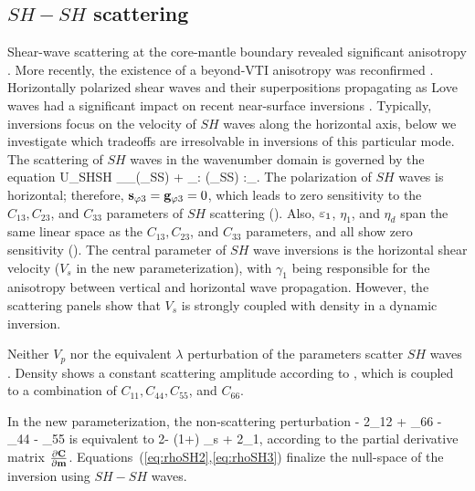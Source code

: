 \subsection{$SH-SH$ scattering}
%
Shear-wave scattering at the core-mantle boundary revealed significant anisotropy  \citep{fukao1984,silver1991,babuska1991,vinnik1992}. More recently, the existence of a beyond-VTI anisotropy was reconfirmed \citep{wookey2005}. Horizontally polarized shear waves and their superpositions propagating as Love waves had a significant impact on recent near-surface inversions \citep{pan2015,dokter2017}. Typically, inversions focus on the velocity of $SH$ waves along the horizontal axis, below we investigate which tradeoffs are irresolvable in inversions of this particular mode.
%
The scattering of $SH$ waves in the wavenumber domain is governed by the equation
\beq \label{eq:USHSH}
\delta U_{SHSH} \equiv   
\sv_\phi \cdot \gv_\phi \delta \hat{\rho}(\Kv_{SS}) + 
%
\sv\sv_\phi : \delta \hat{\cv}(\Kv_{SS}) :\gv\gv_{\phi}.
\eeq 
The polarization of $SH$ waves is horizontal; therefore, $\mathbf{s}_{\varphi 3} = \mathbf{g}_{\varphi 3} = 0$, which leads to zero sensitivity to  the $C_{13}, C_{23}$, and $C_{33}$ parameters of $SH$ scattering (). Also, $\varepsilon_1$, $\eta_1$, and $\eta_d$ span the same linear space as the $C_{13}, C_{23}$, and $C_{33}$ parameters, and all show zero sensitivity (). 
The central parameter of $SH$ wave inversions is the horizontal shear velocity ($V_s$ in the new parameterization), with $\gamma_1$ being responsible for the anisotropy between vertical and horizontal wave propagation. However, the scattering panels  show that $V_s$ is strongly coupled with density in a dynamic inversion.

Neither $V_p$ nor the equivalent $\lambda$ perturbation of the parameters scatter $SH$ waves \citep{wu1985}. Density shows a constant scattering amplitude according to , which is coupled to a combination of $C_{11},C_{44},C_{55}$, and $C_{66}$.




In the new parameterization, the non-scattering perturbation
\beq \label{eq:rhoSH2}
\rhov - 2\Cv_{12} + \Cv_{66} - \Cv_{44} - \Cv_{55} 
\eeq
is equivalent to
\beq \label{eq:rhoSH3}
2\varkappa \rhov - (1+\varkappa) \Vv_s + 2\gammav_1,
\eeq
according to the partial derivative matrix $\frac{\partial \mathbf{C}}{\partial \mathbf{m}}$.
Equations~(\ref{eq:rhoSH2},\ref{eq:rhoSH3}) finalize the null-space of the inversion using $SH-SH$ waves.

